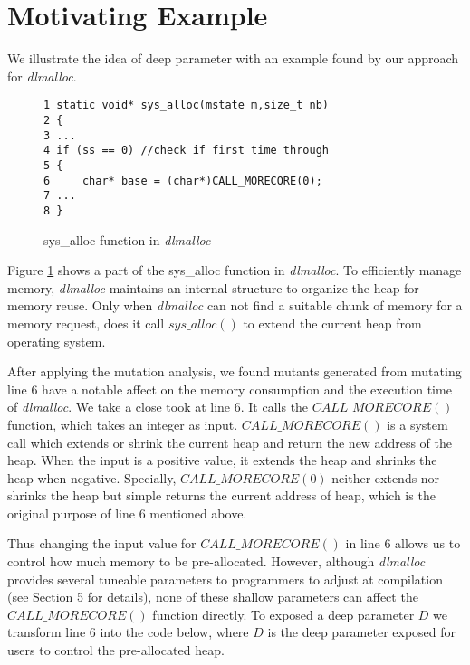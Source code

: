 
\section{Motivating Example}

We illustrate the idea of deep parameter with an example found by our approach for \emph{dlmalloc}.

\begin{figure}[ht]
\begin{lstlisting}
1 static void* sys_alloc(mstate m,size_t nb) 
2 {
3 ...
4 if (ss == 0) //check if first time through
5 { 
6     char* base = (char*)CALL_MORECORE(0);
7 ...
8 }

\end{lstlisting}
\label{exp}
\caption{sys\_alloc function in \emph{dlmalloc}}
\end{figure}

Figure \ref{exp} shows a part of the sys\_alloc function in \emph{dlmalloc}. To efficiently manage memory, \emph{dlmalloc} maintains an internal structure to organize the heap for memory reuse. Only when \emph{dlmalloc} can not find a suitable chunk of memory for a memory request, does it call $sys\_alloc()$ to extend the current heap from operating system.

After applying the mutation analysis, we found mutants generated from mutating line 6 have a notable affect on the memory consumption and the execution time of \emph{dlmalloc}. We take a close took at line 6. It calls the $CALL\_MORECORE()$ function, which takes an integer as input. $CALL\_MORECORE()$ is a system call which extends or shrink the current heap and return the new address of the heap. When the input is a positive value, it extends the heap and shrinks the heap when negative. Specially, $CALL\_MORECORE(0)$ neither extends nor shrinks the heap but simple returns the current address of heap, which is the original purpose of line 6 mentioned above.

Thus changing the input value for $CALL\_MORECORE()$ in line 6 allows us to control how much memory to be pre-allocated. However, although \emph{dlmalloc} provides several tuneable parameters to programmers to adjust at compilation (see Section 5 for details), none of these shallow parameters can affect the $CALL\_MORECORE()$ function directly. To exposed a deep parameter $D$ we transform line 6 into the code below, where $D$ is the deep parameter exposed for users to control the pre-allocated heap.

